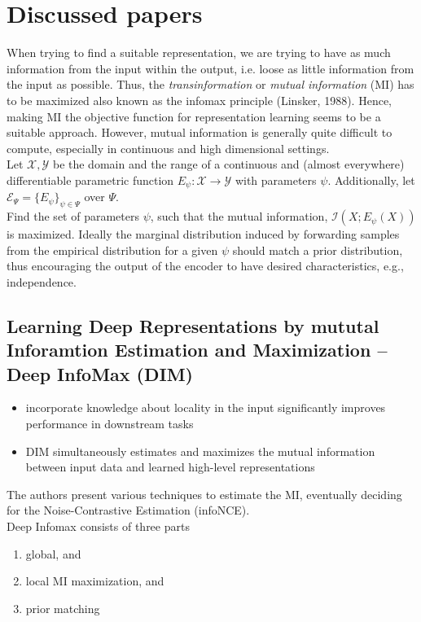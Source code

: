 \documentclass[]{article}
\begin{document}
\section{Discussed papers}
When trying to find a suitable representation, we are trying to have as much information from the input within the output, i.e. loose as little information from the input as possible. Thus, the \textit{transinformation} or \textit{mutual information} (MI) has to be maximized also known as the infomax principle (Linsker, 1988). Hence, making MI the objective function for representation learning seems to be a suitable approach. However,  mutual information is generally quite difficult to compute, especially in continuous and high dimensional settings.\\
Let $\mathcal{X}, \mathcal{Y}$ be the domain and the range of a continuous and (almost everywhere) differentiable parametric function
$E_\psi:\mathcal{X}\rightarrow\mathcal{Y}$ with parameters $\psi$. Additionally, let $\mathcal{E}_\Psi=\{E_\psi\}_{\psi\in\Psi}$ over $\Psi$. \\
Find the set of parameters $\psi$, such that the mutual information, $\mathcal{I}(X;E_\psi(X))$ is maximized. Ideally the marginal distribution induced by forwarding samples from the empirical distribution for a given $\psi$ should match a prior distribution, thus encouraging the output of the encoder to have desired characteristics, e.g., independence.
\subsection{Learning Deep Representations by mututal Inforamtion Estimation and Maximization -- Deep InfoMax (DIM)}
\begin{itemize}
	\item incorporate knowledge about locality in the input significantly improves performance in downstream tasks
	\item DIM simultaneously estimates and maximizes the mutual information between input data and learned high-level representations
\end{itemize} 

The authors present various techniques to estimate the MI, eventually deciding for the Noise-Contrastive Estimation (infoNCE).\\

Deep Infomax consists of three parts
\begin{enumerate}
	\item global, and
	\item local MI maximization, and
	\item prior matching
\end{enumerate}
\end{document}
